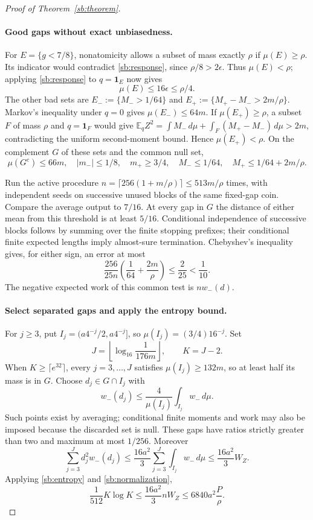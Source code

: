 \begin{proof}[Proof of Theorem~\ref{sb:theorem}]
\paragraph{Good gaps without exact unbiasedness.}
For $E=\{g<7/8\}$, nonatomicity allows a subset of mass exactly $\rho$
if $\mu(E)\ge\rho$. Its indicator would contradict
\eqref{sb:response}, since $\rho/8>2\epsilon$.
Thus $\mu(E)<\rho$; applying \eqref{sb:response} to $q=\mathbf1_E$
now gives
\[
 \mu(E)\le16\epsilon\le\rho/4.
\]
The other bad sets are
$E_-:=\{M_->1/64\}$ and
$E_+:=\{M_+-M_->2m/\rho\}$.
Markov's inequality under $q=0$ gives $\mu(E_-)\le64m$.
If $\mu(E_+)\ge\rho$, a subset $F$ of mass $\rho$ and
$q=\mathbf1_F$ would give
$\mathbb E_qZ^2=\int M_-\,d\mu+\int_F(M_+-M_-)\,d\mu>2m$,
contradicting the uniform second-moment bound. Hence $\mu(E_+)<\rho$.
On the complement $G$ of these sets and the common null set,
\begin{equation}\label{sb:good}
 \mu(G^c)\le66m,\quad
 |m_-|\le1/8,\quad m_+\ge3/4,\quad
 M_-\le1/64,\quad M_+\le1/64+2m/\rho.
\end{equation}

Run the active procedure
$n=\lceil256(1+m/\rho)\rceil\le513m/\rho$ times, with independent
seeds on successive unused blocks of the same fixed-gap coin. Compare the
average output to $7/16$. At every gap in $G$ the distance of either mean
from this threshold is at least $5/16$. Conditional independence of
successive blocks follows by summing over the finite stopping prefixes;
their conditional finite expected lengths imply almost-sure termination.
Chebyshev's inequality gives, for either sign, an error at most
\[
 \frac{256}{25n}\left(\frac1{64}+\frac{2m}{\rho}\right)
 \le\frac2{25}<\frac1{10}.
\]
The negative expected work of this common test is $nw_-(d)$.

\paragraph{Select separated gaps and apply the entropy bound.}
For $j\ge3$, put
$I_j=(a4^{-j}/2,a4^{-j}]$, so
$\mu(I_j)=(3/4)16^{-j}$. Set
\[
 J=\left\lfloor\log_{16}\frac1{176m}\right\rfloor,
 \qquad K=J-2.
\]
When $K\ge\lceil e^{32}\rceil$, every $j=3,\ldots,J$ satisfies
$\mu(I_j)\ge132m$, so at least half its mass is in $G$.
Choose $d_j\in G\cap I_j$ with
\[
 w_-(d_j)\le\frac4{\mu(I_j)}\int_{I_j}w_-\,d\mu.
\]
Such points exist by averaging; conditional finite moments and work may
also be imposed because the discarded set is null. These gaps have ratios
strictly greater than two and maximum at most $1/256$. Moreover
\[
 \sum_{j=3}^J d_j^2w_-(d_j)
 \le\frac{16a^2}{3}\sum_{j=3}^J\int_{I_j}w_-\,d\mu
 \le\frac{16a^2}{3}W_Z.
\]
Applying \eqref{sb:entropy} and \eqref{sb:normalization},
\begin{equation}\label{sb:entropy-product}
 \frac1{512}K\log K
 \le\frac{16a^2}{3}nW_Z
 \le6840a^2\frac P\rho.
\end{equation}


\end{proof}
